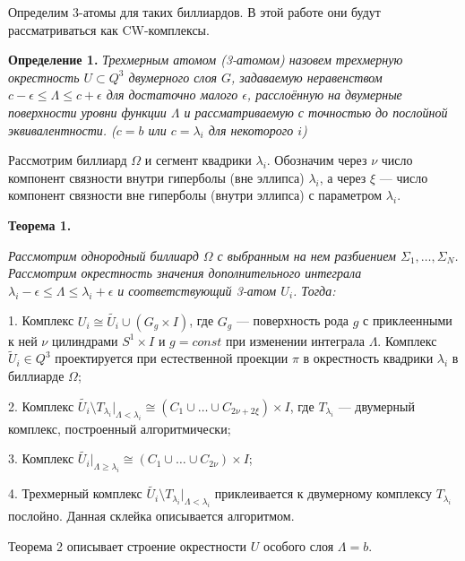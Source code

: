 Определим 3-атомы для таких биллиардов. В этой работе они будут рассматриваться как CW-комплексы.

\textbf{Определение 1.} { \it Трехмерным атомом (3-атомом) назо\-вем трехмерную окрестность $U \subset Q^3$ двумерного слоя $G$, зада\-ваемую неравенством $c - \epsilon \leq \Lambda \leq c + \epsilon$ для достаточно малого $\epsilon$, расслоённую на двумерные поверхности уровни функции $\Lambda$ и рассматриваемую с точностью до послойной экви\-вален\-тности. ($c = b$ или $c = \lambda_i$ для некоторого $i$)}

Рассмотрим биллиард $\Omega$ и сегмент квадрики $\lambda_i$. Обоз\-начим через $\nu$ число компонент связности внутри гиперболы (вне эллипса) $\lambda_i$, а через $\xi$ --- число компонент связности вне гиперболы (внутри эллипса) с параметром $\lambda_i$.

\textbf{Теорема 1.}
	{\it Рассмотрим однородный биллиард $\Omega$ с выб\-ран\-ным на нем разбиением $\Sigma_1, \ldots, \Sigma_N$. Рассмотрим окрест\-ность значения дополнительного интеграла $\lambda_i - \epsilon \leq \Lambda \leq \lambda_i + \epsilon$ и соответствующий 3-атом $U_i$. Тогда:

	1. Комплекс $U_i \cong \tilde{U_i} \cup (G_g \times I)$, где $G_g$ --- поверхность рода $g$ с приклеенными к ней $\nu$ цилиндрами $S^1 \times I$ и $g = const$ при изменении интеграла $\Lambda$. Комплекс $\tilde U_i \in Q^3$ проектируется при естественной проекции $\pi$ в окрестность квадрики $\lambda_i$ в биллиарде $\Omega$;
		
	2. Комплекс $\tilde{U_i} \setminus T_{\lambda_i} |_{\Lambda < \lambda_i} \cong (C_1 \cup \ldots \cup C_{2\nu+2\xi}) \times I$, где $T_{\lambda_i} $ --- двумерный комплекс, построенный алгорит\-мически;
		
	3. Комплекс $\tilde{U_i} |_{\Lambda \geq \lambda_i} \cong (C_1 \cup \ldots \cup C_{2\nu}) \times I$;
		
		4. Трехмерный комплекс $\tilde{U_i} \setminus T_{\lambda_i} |_{\Lambda < \lambda_i}$ прик\-леи\-вается к двумерному комплексу $T_{\lambda_i}$ послойно. Данная склей\-ка описы\-вается алгоритмом.
}

Теорема 2 описывает строение окрестности $U$ особого слоя $\Lambda = b$.

